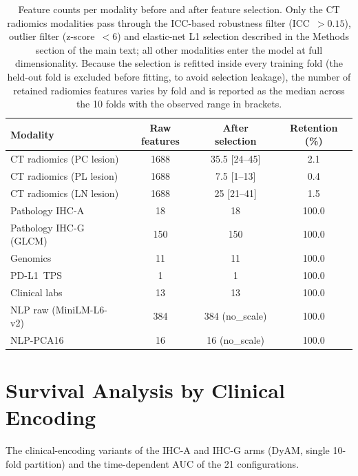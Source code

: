 \documentclass[12pt]{article}
\begin{document}
\begin{table}[H]
\centering
\caption{Feature counts per modality before and after feature selection.
  Only the CT radiomics modalities pass through the ICC-based robustness
  filter (ICC~$>0.15$), outlier filter (z-score~$<6$) and elastic-net L1
  selection described in the Methods section of the main text; all other
  modalities enter the model at full dimensionality.
  Because the selection is refitted inside every training fold (the held-out
  fold is excluded before fitting, to avoid selection leakage), the number
  of retained radiomics features varies by fold and is reported as the
  median across the 10 folds with the observed range in brackets.}
\label{tab:supp_features}
\begin{tabular}{lccc}
\toprule
\textbf{Modality} & \textbf{Raw features} & \textbf{After selection} &
\textbf{Retention (\%)} \\
\midrule
CT radiomics (PC lesion)       & 1688 & 35.5 [24--45] & 2.1 \\
CT radiomics (PL lesion)       & 1688 & 7.5 [1--13]  & 0.4 \\
CT radiomics (LN lesion)       & 1688 & 25 [21--41] & 1.5 \\
Pathology IHC-A                & 18   & 18           & 100.0 \\
Pathology IHC-G (GLCM)         & 150  & 150          & 100.0 \\
Genomics                       & 11   & 11           & 100.0 \\
PD-L1~TPS                      & 1    & 1            & 100.0 \\
Clinical labs                  & 13   & 13           & 100.0 \\
NLP raw (MiniLM-L6-v2)         & 384  & 384 (no\_scale) & 100.0 \\
NLP-PCA16                      & 16   & 16 (no\_scale)  & 100.0 \\
\bottomrule
\end{tabular}
\end{table}





\clearpage
\section{Survival Analysis by Clinical Encoding}

The clinical-encoding variants of the IHC-A and IHC-G arms (DyAM, single 10-fold partition) and the time-dependent AUC of the 21 configurations.
\end{document}
